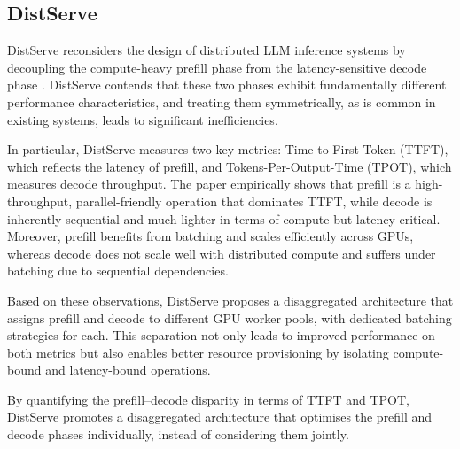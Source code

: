 \documentclass[12pt,twoside]{report}
\begin{document}
\subsection{DistServe}
DistServe reconsiders the design of distributed LLM inference systems by decoupling the compute-heavy prefill phase from the latency-sensitive decode phase \cite{zhang2024distserve}.
DistServe contends that these two phases exhibit fundamentally different performance characteristics, and treating them symmetrically, as is common in existing systems, leads to significant inefficiencies.

In particular, DistServe measures two key metrics: Time-to-First-Token (TTFT), which reflects the latency of prefill, and Tokens-Per-Output-Time (TPOT), which measures decode throughput.
The paper empirically shows that prefill is a high-throughput, parallel-friendly operation that dominates TTFT, while decode is inherently sequential and much lighter in terms of compute but latency-critical.
Moreover, prefill benefits from batching and scales efficiently across GPUs, whereas decode does not scale well with distributed compute and suffers under batching due to sequential dependencies.

Based on these observations, DistServe proposes a disaggregated architecture that assigns prefill and decode to different GPU worker pools, with dedicated batching strategies for each.
This separation not only leads to improved performance on both metrics but also enables better resource provisioning by isolating compute-bound and latency-bound operations.

By quantifying the prefill–decode disparity in terms of TTFT and TPOT, DistServe promotes a disaggregated architecture that optimises the prefill and decode phases individually, instead of considering them jointly.

\end{document}
